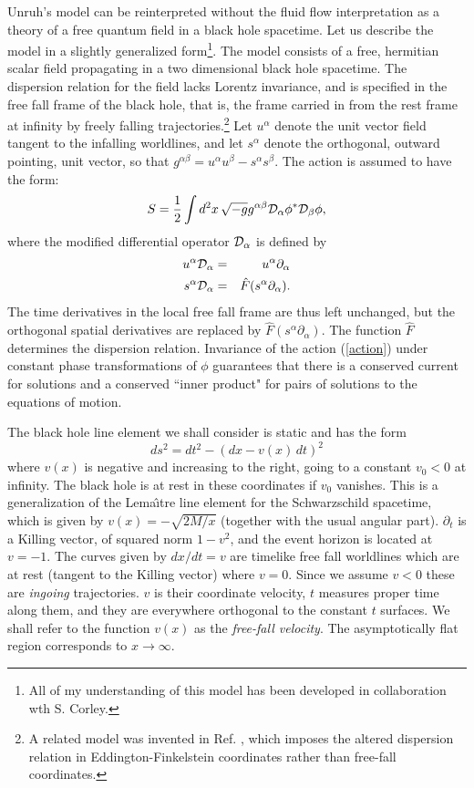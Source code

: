 Unruh's model can be reinterpreted without the fluid flow
interpretation as a theory of a free quantum field in a black hole
spacetime. Let us describe the model in a slightly generalized
form\footnote{All of my understanding of this model has been developed
in collaboration wth S. Corley.}\cite{Jaco-mex,CorlJaco}.  The model
consists of a free, hermitian scalar field propagating in a two
dimensional black hole spacetime. The dispersion relation for the field
lacks Lorentz invariance, and is specified in the free fall frame of
the black hole, that is, the frame carried in from the rest frame at
infinity by freely falling trajectories.\footnote{A related model was
invented in Ref. \cite{BMPS}, which imposes the altered dispersion
relation in Eddington-Finkelstein coordinates rather than free-fall
coordinates.} Let $u^\alpha$ denote the unit vector field tangent to
the infalling worldlines, and let $s^\alpha$ denote the orthogonal,
outward pointing, unit vector, so that $g^{\alpha\beta}=u^\alpha
u^\beta-s^\alpha s^\beta$.  The action is assumed to have the form:
\begin{equation}
S={1\over2}\int d^2x \, \sqrt{-g} g^{\alpha\beta} {\cal D}_\alpha\phi^* {\cal D}_\beta\phi,
\label{action}
\end{equation}
where the modified differential operator ${\cal D}_\alpha$ is defined by
\begin{eqnarray}
u^\alpha {\cal D}_\alpha &=& u^\alpha \partial_\alpha\\
s^\alpha {\cal D}_\alpha &= &\hat{F}(s^\alpha \partial_\alpha).
\end{eqnarray}
The time derivatives in the local free fall frame are thus left
unchanged, but the orthogonal spatial derivatives are replaced by
$\hat{F}(s^\alpha \partial_\alpha)$.  The function $\hat{F}$ determines
the dispersion relation.  Invariance of the action (\ref{action}) under
constant phase transformations of $\phi$ guarantees that there is a
conserved current for solutions and a conserved ``inner product" for
pairs of solutions to the equations of motion.

The black hole line element we shall consider is static and has the
form 
\begin{equation} 
ds^2=dt^2-(dx-v(x)\, dt)^2 
\end{equation} where
$v(x)$ is negative and increasing to the right, going to a constant
$v_0<0$ at infinity. The black hole is at rest in these coordinates if
$v_0$ vanishes.  This is a generalization of the Lema\^{\i}tre line
element for the Schwarzschild spacetime, which is given by
$v(x)=-\sqrt{2M/x}$ (together with the usual angular part).
$\partial_t$ is a Killing vector, of squared norm $1-v^2$, and the
event horizon is located at $v=-1$.  The curves given by $dx/dt=v$ are
timelike free fall worldlines which are at rest (tangent to the Killing
vector) where $v=0$.  Since we assume $v<0$ these are {\it ingoing}
trajectories.  $v$ is their coordinate velocity, $t$ measures proper
time along them, and they are everywhere orthogonal to the constant $t$
surfaces.  We shall refer to the function $v(x)$ as the {\it free-fall
velocity}.  The asymptotically flat region corresponds to
$x\rightarrow\infty$.

